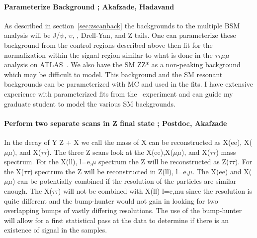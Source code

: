 \paragraph{Parameterize Background ;  Akafzade, Hadavand} %
As described in section~\ref{sec:zscanback} the backgrounds to the multiple BSM analysis  will be J/$\psi$, $\upsilon$, \ttbar, Drell-Yan, and Z tails.  One can 
parameterize these background from the control regions described above then fit for the normalization within the signal region similar to what is done in the
$\tau\tau \mu \mu$ analysis on ATLAS~\cite{tautaumumu}.  We also have the SM ZZ* as a non-peaking background which may be difficult to model. This background and the SM resonant backgrounds 
can be parameterized with MC and used in the fits. I have extensive experience with parameterized fits from the \babar\ experiment and can guide my graduate student to model the various SM backgrounds.

\paragraph{Perform two separate scans in Z final state ;  Postdoc, Akafzade} %
In the decay of Y \too Z + X we call the mass of X can be reconstructed as X(ee), X($\mu\mu$), and X($\tau\tau$).  
The three Z scans look at the X(ee),X($\mu\mu$), and X($\tau\tau$) mass spectrum. For the X(ll), l=e,$\mu$ spectrum the Z will be reconstructed as Z($\tau\tau$).  For the X($\tau\tau$) spectrum the Z will be reconstructed in Z(ll), l=e,$\mu$.  
The X(ee) and X($\mu\mu$) can be potentially combined if the resolution of the particles are similar enough.  The X($\tau\tau$) will not be combined with X(ll) l=e,mu since the resolution is quite different and the bump-hunter would not gain in looking for two overlapping bumps of vastly differing resolutions.
The use of the bump-hunter will allow for a first statistical pass at the data to determine if there is an existence of signal in the samples.  


